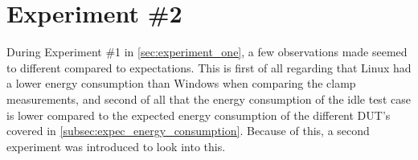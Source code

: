 \section{Experiment \#2}\label{sec:experiment_two}

During Experiment \#1 in \cref{sec:experiment_one}, a few observations made seemed to different compared to expectations. This is first of all regarding that Linux had a lower energy consumption than Windows when comparing the clamp measurements, and second of all that the energy consumption of the idle test case is lower compared to the expected energy consumption of the different DUT's covered in \cref{subsec:expec_energy_consumption}. Because of this, a second experiment was introduced to look into this.

